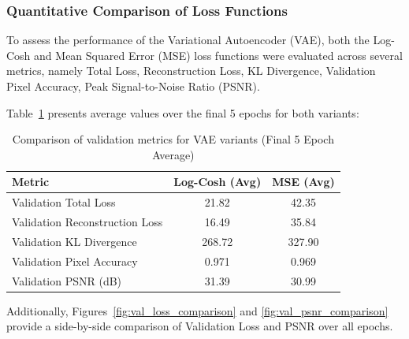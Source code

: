 \subsubsection{Quantitative Comparison of Loss Functions} \label{subsubsec:vae_quant_comparison}
To assess the performance of the Variational Autoencoder (VAE), both the Log-Cosh and Mean Squared Error (MSE) loss functions were evaluated across several metrics, namely Total Loss, Reconstruction Loss, KL Divergence, Validation Pixel Accuracy, Peak Signal-to-Noise Ratio (PSNR). 

Table~\ref{tab:loss_comparison} presents average values over the final 5 epochs for both variants:

\begin{table}[htbp]
    \centering
    \begin{tabular}{lcc}
        \toprule
        \textbf{Metric} & \textbf{Log-Cosh (Avg)} & \textbf{MSE (Avg)} \\
        \midrule
        Validation Total Loss & 21.82 & 42.35 \\
        Validation Reconstruction Loss & 16.49 & 35.84 \\
        Validation KL Divergence & 268.72 & 327.90 \\
        Validation Pixel Accuracy & 0.971 & 0.969 \\
        Validation PSNR (dB) & 31.39 & 30.99 \\
        \bottomrule
    \end{tabular}
    \caption{Comparison of validation metrics for VAE variants (Final 5 Epoch Average)}
    \label{tab:loss_comparison}
\end{table}

Additionally, Figures~\ref{fig:val_loss_comparison} and \ref{fig:val_psnr_comparison} provide a side-by-side comparison of Validation Loss and PSNR over all epochs.




